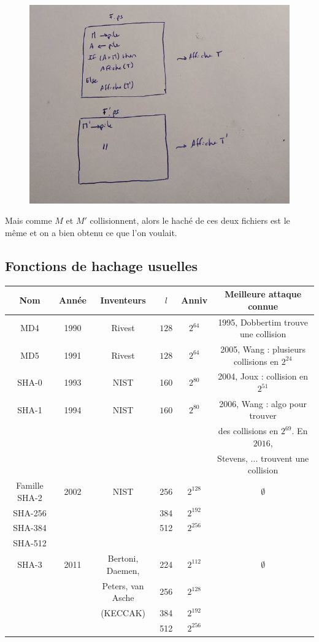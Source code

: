                 \begin{figure}[H]
                    \centering
                    \includegraphics[width=.7\textwidth]{07}
                \end{figure} \noindent
                
                Mais comme $M$ et $M'$ collisionnent, alors le haché de ces deux fichiers est le même et on a bien obtenu ce que l'on voulait.

        \subsection{Fonctions de hachage usuelles}
            \begin{tabular}{c|c|c|c|c|c}
                Nom & Année & Inventeurs & $l$ & Anniv & Meilleure attaque connue \\
                \hline
                MD4 & 1990 & Rivest & $128$ & $2^{64}$ & 1995, Dobbertim trouve une collision \\
                \hline
                MD5 & 1991 & Rivest & $128$ & $2^{64}$ & 2005, Wang : plusieurs collisions en $2^{24}$\\
                \hline
                SHA{\color{blue}-0} & 1993 & NIST & 160 & $2^{80}$ & 2004, Joux : collision en $2^{51}$ \\
                \hline
                SHA-1& 1994 & NIST & $160$ & $2^{80}$ & 2006, Wang : algo pour trouver \\
                &&&&& des collisions en $2^{69}$. En $2016$, \\
                &&&&& Stevens, ... trouvent une collision \\
                \hline
                {\color{blue} Famille SHA-2}& 2002 & NIST & 256 & $2^{128}$ & $\emptyset$ \\
                SHA-256 &&& 384 & $2^{192}$& \\
                SHA-384 &&& 512 & $2^{256}$& \\
                SHA-512 &&&&& \\
                \hline
                SHA-3 & 2011 & Bertoni, Daemen, & 224 & $2^{112}$ & $\emptyset$ \\
                && Peters, van Asche & 256 & $2^{128}$ &\\
                && (KECCAK) & 384 & $2^{192}$ &\\
                &&& 512 & $2^{256}$ &\\
            \end{tabular}

